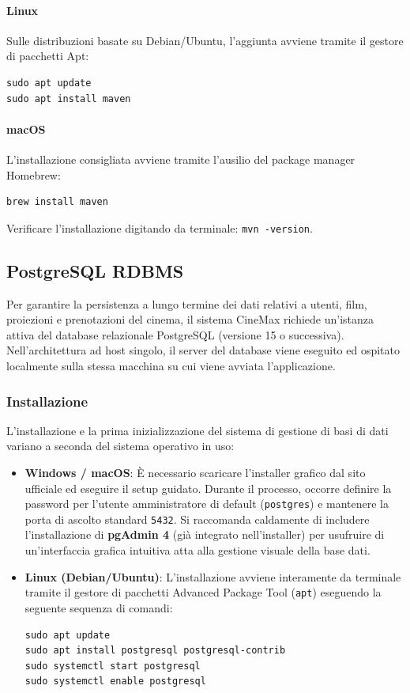 \documentclass[12pt, a4paper]{article}
\begin{document}
\paragraph{Linux}
Sulle distribuzioni basate su Debian/Ubuntu, l'aggiunta avviene tramite il gestore di pacchetti Apt:
\begin{verbatim}
sudo apt update
sudo apt install maven
\end{verbatim}

\paragraph{macOS}
L'installazione consigliata avviene tramite l'ausilio del package manager Homebrew:
\begin{verbatim}
brew install maven
\end{verbatim}
Verificare l'installazione digitando da terminale: \texttt{mvn -version}.

\subsection{PostgreSQL RDBMS}
Per garantire la persistenza a lungo termine dei dati relativi a utenti, film, proiezioni e prenotazioni del cinema, il sistema CineMax richiede un'istanza attiva del database relazionale PostgreSQL (versione 15 o successiva). Nell'architettura ad host singolo, il server del database viene eseguito ed ospitato localmente sulla stessa macchina su cui viene avviata l'applicazione.

\subsubsection{Installazione}
L'installazione e la prima inizializzazione del sistema di gestione di basi di dati variano a seconda del sistema operativo in uso:
\begin{itemize}
    \item \textbf{Windows / macOS}: È necessario scaricare l'installer grafico dal sito ufficiale ed eseguire il setup guidato. Durante il processo, occorre definire la password per l'utente amministratore di default (\texttt{postgres}) e mantenere la porta di ascolto standard \texttt{5432}. Si raccomanda caldamente di includere l'installazione di \textbf{pgAdmin 4} (già integrato nell'installer) per usufruire di un'interfaccia grafica intuitiva atta alla gestione visuale della base dati.
    \item \textbf{Linux (Debian/Ubuntu)}: L'installazione avviene interamente da terminale tramite il gestore di pacchetti Advanced Package Tool (\texttt{apt}) eseguendo la seguente sequenza di comandi:
\begin{verbatim}
sudo apt update
sudo apt install postgresql postgresql-contrib
sudo systemctl start postgresql
sudo systemctl enable postgresql
\end{verbatim}
\end{itemize}
\end{document}
